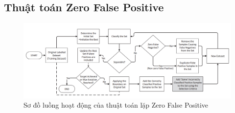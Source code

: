 \documentclass[./../main.tex]{subfiles}
\begin{document}
\subsection{Thuật toán Zero False Positive}
\begin{figure}[ht!]
	\includegraphics[width=\linewidth]{./images/zfp_flow_chart.png}
	\caption{Sơ đồ luồng hoạt động của thuật toán lặp Zero False Positive}
	\label{fig:zfp_flow_chart}
\end{figure}
\end{document}
